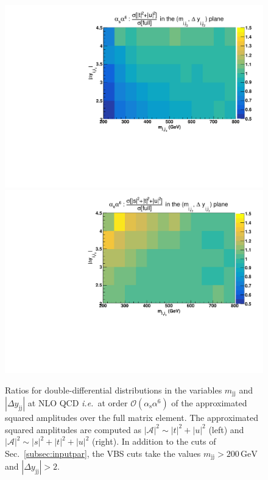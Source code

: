 \documentclass[twocolumn,epjc3]{svjour3} %
\newcommand{\Pj}{\ensuremath{\text{j}}\xspace}
\newcommand{\GeV}{\ensuremath{\,\text{GeV}}\xspace}
\newcommand{\alphas}{\ensuremath{\alpha_\text{s}}\xspace}
\begin{document}
    \begin{figure}
    \centering
    {\includegraphics[scale=0.395]{figures/scanfigures/a6as_vbfnloVSrecola_tu.pdf}}
    {\includegraphics[scale=0.395]{figures/scanfigures/a6as_vbfnloVSrecola_stu.pdf}}
    \caption{Ratios for double-differential distributions in the variables $m_{\Pj\Pj}$ and $|\Delta y_{\Pj\Pj}|$ at NLO QCD \emph{i.e.}\ at order $\mathcal{O}(\alphas\alpha^6)$ of the approximated squared amplitudes over the full matrix element.
    The approximated squared amplitudes are computed as $|\mathcal{A}|^2 \sim |t|^2+|u|^2$ (left) and $|\mathcal{A}|^2 \sim |s|^2+|t|^2+|u|^2$ (right).
    In addition to the cuts of Sec.~\protect\ref{subsec:inputpar}, the VBS cuts take the values $m_{\Pj\Pj}>200 \GeV$ and $|\Delta y_{\Pj\Pj}|>2$.}
    \label{fig:ratio2d_NLO}
    \end{figure}
\end{document}
